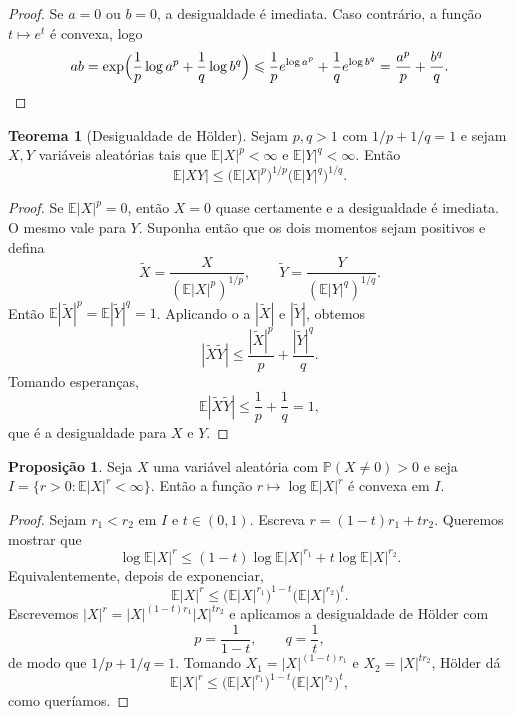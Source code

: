 \documentclass[12pt,portuguese]{article}
\theoremstyle{definition}
\newtheorem{theorem}{Teorema}
\newtheorem{proposition}[proposition]{Proposição}
\theoremstyle{plainexercise}
\theoremstyle{starredexercise}
\theoremstyle{definition}
\begin{document}
\begin{proof}
Se $a=0$ ou $b=0$, a desigualdade é imediata. Caso contrário, a função
$t\longmapsto e^t$ é convexa, logo
\[
ab=\exp\Bigl(\frac{1}{p}\log a^p+\frac{1}{q}\log b^q\Bigr)
\leqslant
\frac{1}{p}e^{\log a^p}+\frac{1}{q}e^{\log b^q}
=
\frac{a^p}{p}+\frac{b^q}{q}.
\]
\end{proof}

\begin{theorem}[Desigualdade de Hölder]\label{thm:holder}
Sejam $p,q>1$ com $1/p+1/q=1$ e sejam $X,Y$ variáveis aleatórias tais que
$\mathbb{E}|X|^p<\infty$ e $\mathbb{E}|Y|^q<\infty$. Então
\[
\mathbb{E}|XY|\leqslant\bigl(\mathbb{E}|X|^p\bigr)^{1/p}
\bigl(\mathbb{E}|Y|^q\bigr)^{1/q}.
\]
\end{theorem}

\begin{proof}
Se $\mathbb{E}|X|^p=0$, então $X=0$ quase certamente e a desigualdade é
imediata. O mesmo vale para $Y$. Suponha então que os dois momentos sejam
positivos e defina
\[
\tilde X=\frac{X}{(\mathbb{E}|X|^p)^{1/p}},
\qquad
\tilde Y=\frac{Y}{(\mathbb{E}|Y|^q)^{1/q}}.
\]
Então $\mathbb{E}|\tilde X|^p=\mathbb{E}|\tilde Y|^q=1$. Aplicando o
 a $|\tilde X|$ e $|\tilde Y|$, obtemos
\[
|\tilde X\tilde Y|\leqslant\frac{|\tilde X|^p}{p}+\frac{|\tilde Y|^q}{q}.
\]
Tomando esperanças,
\[
\mathbb{E}|\tilde X\tilde Y|\leqslant\frac{1}{p}+\frac{1}{q}=1,
\]
que é a desigualdade para $X$ e $Y$.
\end{proof}

\begin{proposition}\label{prop:log-convexa}
Seja $X$ uma variável aleatória com $\mathbb{P}(X\neq0)>0$ e seja
$I=\{r>0:\mathbb{E}|X|^r<\infty\}$. Então a função $r\longmapsto\log\mathbb{E}|X|^r$
é convexa em $I$.
\end{proposition}

\begin{proof}
Sejam $r_1<r_2$ em $I$ e $t\in(0,1)$. Escreva
$r=(1-t)r_1+tr_2$. Queremos mostrar que
\[
\log\mathbb{E}|X|^r
\leqslant
(1-t)\log\mathbb{E}|X|^{r_1}+t\log\mathbb{E}|X|^{r_2}.
\]
Equivalentemente, depois de exponenciar,
\[
\mathbb{E}|X|^r
\leqslant
\bigl(\mathbb{E}|X|^{r_1}\bigr)^{1-t}
\bigl(\mathbb{E}|X|^{r_2}\bigr)^{t}.
\]
Escrevemos $|X|^r=|X|^{(1-t)r_1}|X|^{tr_2}$ e aplicamos a desigualdade de
Hölder com
\[
p=\frac{1}{1-t},
\qquad
q=\frac{1}{t},
\]
de modo que $1/p+1/q=1$. Tomando
$X_1=|X|^{(1-t)r_1}$ e $X_2=|X|^{tr_2}$, Hölder dá
\[
\mathbb{E}|X|^r
\leqslant
\bigl(\mathbb{E}|X|^{r_1}\bigr)^{1-t}
\bigl(\mathbb{E}|X|^{r_2}\bigr)^{t},
\]
como queríamos.
\end{proof}
\end{document}

